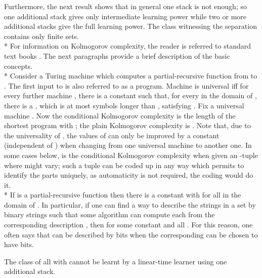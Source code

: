 \documentclass{LMCS}
\theoremstyle{plain}\newtheorem{athm}[thm]{Theorem}
\theoremstyle{plain}\newtheorem{aprop}[thm]{Proposition}
\theoremstyle{plain}\newtheorem{aprob}[thm]{Open Problem}
\theoremstyle{plain}\newtheorem{acor}[thm]{Corollary}
\theoremstyle{plain}\newtheorem{alem}[thm]{Lemma}
\theoremstyle{definition}\newtheorem{adefn}[thm]{Definition}
\theoremstyle{definition}\newtheorem{arem}[thm]{Remark}
\theoremstyle{plain}\newtheorem{aexmp}[thm]{Example}
\theoremstyle{plain}\newtheorem{aclm}[thm]{Claim}
\def\sp{\\*\indent}
\begin{document}
\noindent
Furthermore, the next result shows that in general one stack is not enough;
so one additional stack gives only intermediate learning power while two
or more additional stacks give the full learning power. The class witnessing
the separation contains only finite sets.
\sp
For information on Kolmogorov complexity,
the reader is referred to standard text books \cite{Ca02,DH10,LV08,Ni09}. 
The next paragraphs provide a brief description of the basic concepts.
\sp
Consider a Turing machine  which computes a partial-recursive function from 
 to . The first input to  
is also referred to as a program.
Machine  is universal iff for every further
machine , there is a constant  such that, for every 
in the domain of , there is a , which is at most  symbols longer than
, satisfying . 
Fix a universal machine . Now the conditional
Kolmogorov complexity  is the length of the shortest program
 with ; the plain Kolmogorov complexity 
is . Note that, due to the universality of ,
the values of  can only be improved by a constant 
(independent of )
when changing from one universal machine to another one.
In some cases below,  is the conditional
Kolmogorov complexity when given an -tuple 
where  might vary; such a tuple can be coded up in any way which
permits to identify the parts uniquely, as automaticity is not required,
the coding  would do it.
\sp
If  is a partial-recursive function then there is a constant  with
 for all  in the domain of . In particular,
if one can find a way to describe the strings  in a set 
by binary strings 
such that some algorithm can compute each 
from the corresponding description , then 
for some constant  and all . For this reason, one often
says that  can be described by  bits when the corresponding
 can be chosen to have  bits.

\begin{thm} \label{th:stackminusage}
The class of all  with
 cannot be learnt by a linear-time learner using
one additional stack.
\end{thm}
\end{document}
